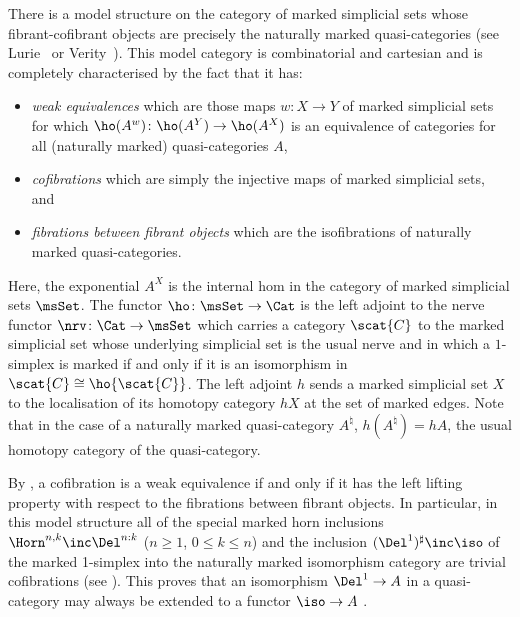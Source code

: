     \begin{rec}\label{rec:qmc-quasi-marked}
There is a model structure on the category of marked simplicial sets whose fibrant-cofibrant objects are precisely the naturally marked quasi-categories (see Lurie~\cite[\S 3.1]{Lurie:2009fk} or Verity~\cite[\S 6.5]{Verity:2007:wcs1}). This model category is  combinatorial and cartesian and is completely characterised by the fact that it has:
      \begin{itemize}
        \item {\em weak equivalences\/} which are those maps $w\colon X\to Y$ of marked simplicial sets for which $\ho(A^w)\colon\ho(A^Y)\to\ho(A^X)$ is an equivalence of categories for all (naturally marked) quasi-categories $A$,
        \item {\em cofibrations\/} which are simply the injective maps of marked simplicial sets, and
        \item {\em fibrations between fibrant objects\/} which are the isofibrations of naturally marked quasi-categories.
      \end{itemize}
      Here, the exponential $A^X$ is the internal hom in the category of marked simplicial sets $\msSet$. The functor $\ho\colon\msSet\to\Cat$ is the left adjoint to the nerve functor $\nrv\colon\Cat\to\msSet$ which carries a category $\scat{C}$ to the marked simplicial set whose underlying simplicial set is the usual nerve and in which a $1$-simplex is marked if and only if it is an isomorphism in $\scat{C} \cong \ho{\scat{C}}$. The left adjoint $h$ sends a marked simplicial set $X$ to the localisation of its homotopy category $hX$ at the set of marked edges. Note that in the case of a naturally marked quasi-category $A^\natural$, $h(A^\natural) = hA$, the usual homotopy category of the quasi-category.

      By \cite[7.14]{Joyal:2007kk}, a cofibration is a weak equivalence if and only if it has the left lifting property with respect to the fibrations between fibrant objects.
        In particular, in this model structure all of the special marked horn inclusions $\Horn^{n,k}\inc\Del^{n:k}$ ($n \geq 1$, $0\leq k\leq n$) and the inclusion $(\Del^1)^\sharp\inc\iso$ of the marked 1-simplex into the naturally marked isomorphism category are trivial cofibrations (see \cite[B.10, B.15]{DuggerSpivak:2011ms}). This proves that an isomorphism $\Del^1 \to A$ in a quasi-category may always be extended to a functor $\iso \to A$ \cite[1.6]{Joyal:2002:QuasiCategories}.
\end{rec}

